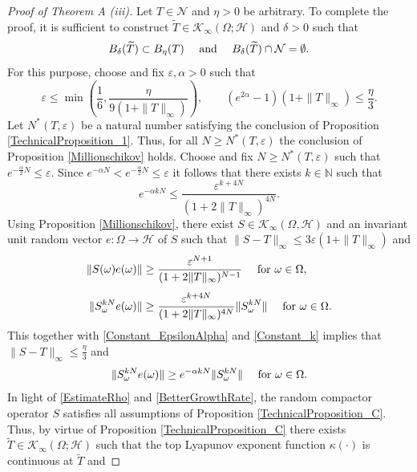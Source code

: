 \documentclass[pdflatex,sn-mathphys-num]{sn-jnl}%
\theoremstyle{thmstyleone}%
\theoremstyle{thmstyletwo}%
\theoremstyle{thmstylethree}%
\newcommand{\N}{\mathbb{N}}
\newcommand{\cH}{\mathcal{H}}
\newcommand{\cK}{\mathcal{K}}
\newcommand{\eps}{\varepsilon}
\numberwithin{equation}{section}
\begin{document}
\begin{proof}[Proof of Theorem A (iii)]
Let $T\in\mathcal N$ and $\eta>0$ be arbitrary.  To complete the proof, it is sufficient to construct $\widetilde T\in  \mathcal K_{\infty}(\Omega;\mathcal H)$ and $\delta>0$ such that 
\begin{equation}\label{Requirement}
B_{\delta}(\widetilde T) \subset B_{\eta}(T)\quad \hbox{ and } \quad B_{\delta}(\widetilde T) \cap \mathcal N=\emptyset.
\end{equation}
For this purpose, choose and fix $\eps, \alpha>0$ such that 
\begin{equation}\label{Constant_EpsilonAlpha}
\eps\leq\min\left(\frac{1}{6}, \frac{\eta}{9(1+\|T\|_{\infty})}\right),\qquad (e^{2\alpha}-1)(1+\|T\|_{\infty})\leq \frac{\eta}{3}.   
\end{equation}
Let $N^*(T,\eps)$ be a natural number satisfying the conclusion of Proposition \ref{TechnicalProposition_1}. Thus, for all $N\geq N^*(T,\eps)$ the conclusion of Proposition \ref{Millionschikov} holds. Choose and fix $N\geq N^*(T,\eps)$ such that $ e^{-\frac{\alpha}{2} N}\leq \eps$. Since $e^{-\alpha N}<e^{-\frac{\alpha}{2} N}\leq \eps$ it follows that there exists $k\in\N$ such that
\begin{equation}\label{Constant_k}
e^{-\alpha kN}
\leq 
\frac{\eps^{k+4N}}{(1+2\|T\|_{\infty})^{4N}}.
\end{equation}
Using Proposition \ref{Millionschikov}, there exist $S\in\cK_{\infty}(\Omega,\cH)$ and an invariant unit random vector $e:\Omega\rightarrow \cH$ of $S$ such that $ \|S-T\|_{\infty}\leq 3\eps (1+ \|T\|_{\infty})$ and 
\begin{align}
\|S(\omega)e(\omega)\|
& \geq \frac{\eps^{N+1}}{(1+2\|T\|_{\infty})^{N-1}}\quad\hbox{ for } \omega\in\Omega,\label{EstimateRho}\\[1ex]
\|S^{kN}_{\omega}e(\omega)\|
&\geq  \frac{\eps^{k+4N}}{(1+2\|T\|_{\infty})^{4N}} \|S_{\omega}^{kN}\|\quad\hbox{ for } \omega\in\Omega.\notag
\end{align}
This together with \eqref{Constant_EpsilonAlpha} and \eqref{Constant_k} implies that $ \|S-T\|_{\infty}\leq \frac{\eta}{3}$ and 
\begin{equation}\label{BetterGrowthRate}
\|S^{kN}_{\omega}e(\omega)\|\geq  e^{-\alpha kN} \|S_{\omega}^{kN}\|\quad\hbox{ for } \omega\in\Omega.
\end{equation}
In light of \eqref{EstimateRho} and \eqref{BetterGrowthRate}, the random compactor operator $S$ satisfies all assumptions of Proposition \ref{TechnicalProposition_C}. Thus, by virtue of Proposition \ref{TechnicalProposition_C} there exists $\widetilde T\in \mathcal K_{\infty}(\Omega;\mathcal H)$ such that the top Lyapunov exponent function $\kappa(\cdot)$ is continuous at $\widetilde T$ and 

\end{proof}
\end{document}

